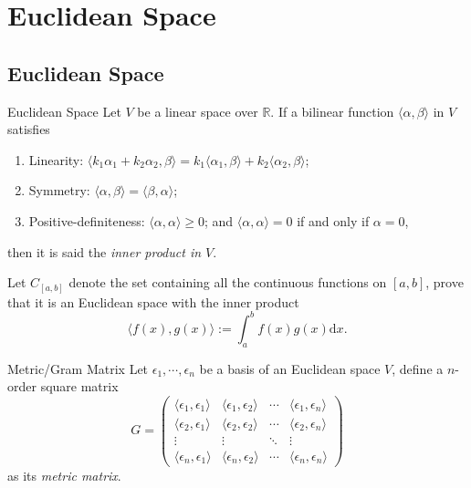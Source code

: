 
\section{Euclidean Space}

\subsection{Euclidean Space}

\begin{definition}{Euclidean Space}{}
  Let $V$ be a linear space over $\mathbb{R}$.
  If a bilinear function $\langle \alpha, \beta \rangle$ in $V$ satisfies
  \begin{enumerate}
  \item Linearity: $\langle k_1\alpha_1 + k_2\alpha_2, \beta \rangle = k_1
    \langle \alpha_1, \beta\rangle + k_2 \langle \alpha_2, \beta \rangle$;
  \item Symmetry: $\langle \alpha, \beta \rangle = \langle \beta, \alpha \rangle$;
  \item Positive-definiteness: $\langle \alpha, \alpha \rangle \geq 0$;
    and $\langle \alpha, \alpha \rangle = 0$ if and only
    if $\alpha = 0$,
  \end{enumerate}
  then it is said the \emph{inner product in $V$}.
\end{definition}

\begin{example}{}{}
  Let $C_{[a,b]}$ denote the set containing all the continuous functions on $[a,
  b]$, prove that it is an Euclidean space with the inner product 
  \begin{equation}
    \langle f(x), g(x) \rangle := \int_a^b f(x)g(x)\mathrm{d} x.
  \end{equation}
\end{example}

\begin{definition}{Metric/Gram Matrix}
  Let $\epsilon_1,\cdots,\epsilon_n$ be a basis of an Euclidean space $V$,
  define a $n$-order square matrix
  \begin{equation}
    G = \begin{pmatrix}
      \langle\epsilon_1,\epsilon_1\rangle & \langle\epsilon_1,\epsilon_2\rangle & \cdots & \langle\epsilon_1,\epsilon_n\rangle \\
      \langle\epsilon_2,\epsilon_1\rangle & \langle\epsilon_2,\epsilon_2\rangle & \cdots & \langle\epsilon_2,\epsilon_n\rangle \\
      \vdots & \vdots & \ddots & \vdots \\
      \langle\epsilon_n,\epsilon_1\rangle & \langle\epsilon_n,\epsilon_2\rangle & \cdots & \langle\epsilon_n,\epsilon_n\rangle
    \end{pmatrix}
  \end{equation}
  as its \emph{metric matrix}.
\end{definition}

